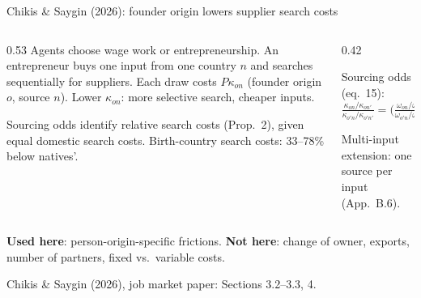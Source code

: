\documentclass[11pt,aspectratio=169,notes]{beamer}
\newcommand{\src}[1]{\par\vfill{\color{mute}\scriptsize #1\par}}
\begin{document}
\begin{frame}{Chikis \& Saygin (2026): founder origin lowers supplier search costs}
\vspace{0.15cm}
\begin{columns}[T]
\begin{column}{0.53\textwidth}
{\footnotesize Agents choose wage work or entrepreneurship. An entrepreneur buys one input from one country $n$ and searches sequentially for suppliers. Each draw costs $P\kappa_{on}$ (founder origin $o$, source $n$). Lower $\kappa_{on}$: more selective search, cheaper inputs.}
\vspace{0.2cm}

{\footnotesize Sourcing odds identify relative search costs (Prop.~2), given equal domestic search costs. Birth-country search costs: 33--78\% below natives'.}
\end{column}
\begin{column}{0.42\textwidth}
\begin{mathbox}
\small Sourcing odds (eq.~15):
\[
\tfrac{\kappa_{on}/\kappa_{on'}}{\kappa_{o'n}/\kappa_{o'n'}}=\Big(\tfrac{\omega_{on}/\omega_{on'}}{\omega_{o'n}/\omega_{o'n'}}\Big)^{-\theta/\eta}
\]
\end{mathbox}
\vspace{0.1cm}
{\footnotesize Multi-input extension: one source per input (App.~B.6).}
\end{column}
\end{columns}
\vspace{0.15cm}
{\small\textbf{Used here}: person-origin-specific frictions. \textbf{Not here}: change of owner, exports, number of partners, fixed vs.\ variable costs.}
\src{Chikis \& Saygin (2026), job market paper: Sections 3.2--3.3, 4.}
\end{frame}
\end{document}
